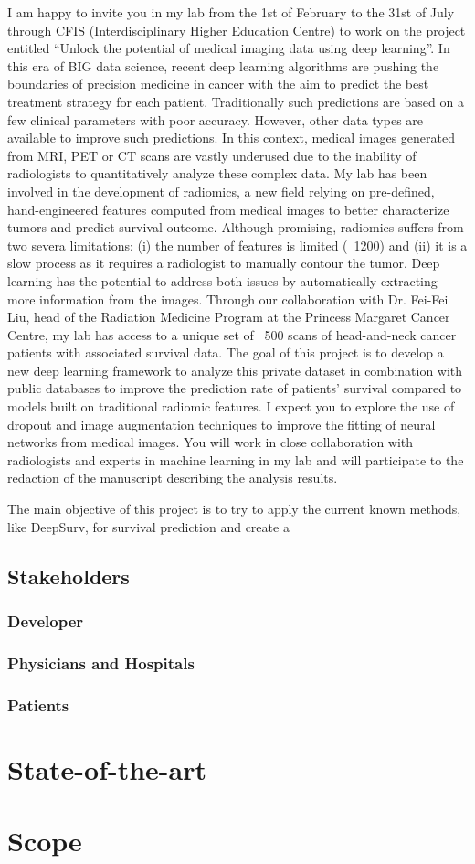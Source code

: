 \documentclass[a4paper]{article}
\begin{document}
I am happy to invite you in my lab from the 1st of February to the 31st of July through CFIS (Interdisciplinary
Higher Education Centre) to work on the project entitled “Unlock the potential of medical imaging data using
deep learning”. In this era of BIG data science, recent deep learning algorithms are pushing the boundaries of
precision medicine in cancer with the aim to predict the best treatment strategy for each patient. Traditionally
such predictions are based on a few clinical parameters with poor accuracy. However, other data types are
available to improve such predictions. In this context, medical images generated from MRI, PET or CT scans
are vastly underused due to the inability of radiologists to quantitatively analyze these complex data. My lab
has been involved in the development of radiomics, a new field relying on pre-defined, hand-engineered
features computed from medical images to better characterize tumors and predict survival outcome. Although
promising, radiomics suffers from two severa limitations: (i) the number of features is limited (~1200) and (ii) it
is a slow process as it requires a radiologist to manually contour the tumor. Deep learning has the potential to
address both issues by automatically extracting more information from the images.
Through our collaboration with Dr. Fei-Fei Liu, head of the Radiation Medicine Program at the Princess
Margaret Cancer Centre, my lab has access to a unique set of ~500 scans of head-and-neck cancer patients
with associated survival data. The goal of this project is to develop a new deep learning framework to analyze
this private dataset in combination with public databases to improve the prediction rate of patients’ survival
compared to models built on traditional radiomic features. I expect you to explore the use of dropout and image
augmentation techniques to improve the fitting of neural networks from medical images. You will work in close
collaboration with radiologists and experts in machine learning in my lab and will participate to the redaction of
the manuscript describing the analysis results.


The main objective of this project is to try to apply the current known methods, like DeepSurv, 
for survival prediction and create a 

\subsection{Stakeholders}

\subsubsection{Developer}
\subsubsection{Physicians and Hospitals}
\subsubsection{Patients}

\section{State-of-the-art}

\section{Scope}

\pagebreak
\printbibliography{}
\end{document}

